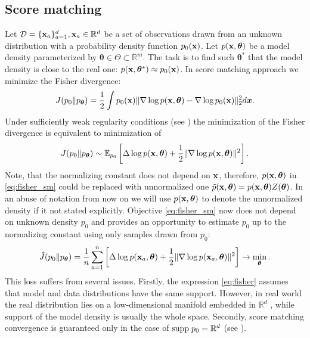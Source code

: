 \subsection{Score matching}
Let ${\cal D} = \{{\bf x}_a\}_{a = 1}^d, {\bf x}_a \in \mathbb{R}^d$ be a set of observations
drawn from an unknown distribution with a probability density function $p_0({\bf x})$.
Let $p({\bf x}, {\bm \theta})$ be a model density parameterized by
${\bm \theta} \in \Theta \subset \mathbb{R}^m$.
The task is to find such ${\bm \theta}^*$ that the model density is close to the real one:
$p({\bf x}, {\bm \theta}^*) \approx p_0({\bf x})$.
In score matching approach we minimize the Fisher divergence:
\begin{equation}
    J(p_0 \| p_{\bm{\theta}}) = \frac12 \int p_0({\bf x})\|\nabla \log p({\bf x}, {\bm \theta}) - \nabla \log p_0({\bf x})\|_2^2 d\bm{x}.
    \label{eq:fisher}
\end{equation}
Under sufficiently weak regularity conditions (see \cite{Hyvarinen2005})
the minimization of the Fisher divergence is equivalent to minimization of
\begin{equation}
    J(p_0 \| p_{\bm{\theta}}) \sim \mathbb{E}_{p_0}\left[\Delta \log p({\bf x}, {\bm \theta}) + \frac{1}{2}\|\nabla \log p({\bf x}, {\bm \theta})\|^2\right]
    \label{eq:fisher_sm}.
\end{equation}
Note, that the normalizing constant does not depend on ${\bf x}$,
therefore, $p({\bf x}, {\bm \theta})$ in \eqref{eq:fisher_sm}
could be replaced with unnormalized one
$\Tilde{p}({\bf x}, {\bm \theta}) = p({\bf x}, {\bm \theta}) Z({\bm \theta})$.
In an abuse of notation from now on we will use
$p({\bf x}, {\bm \theta})$ to denote the unnormalized density if it not stated explicitly.
Objective \eqref{eq:fisher_sm} now does not depend on unknown density $p_0$ and provides an
opportunity to estimate $p_0$ up to the normalizing constant using only samples drawn from $p_0$:
\begin{equation}
    \hat{J}(p_0 \| p_{\bm{\theta}}) = \frac{1}{n}\sum_{a = 1}^n\left[\Delta \log p({\bf x}_a, {\bm \theta}) + \frac{1}{2}\|\nabla \log p({\bf x}_a, {\bm \theta})\|^2\right] \to \min_{{\bm \theta}}.
    \label{eq:fisher_sm_sample}
\end{equation}
This loss suffers from several issues.
Firstly, the expression \eqref{eq:fisher} assumes that model and data distributions
have the same support.
However, in real world the real distribution lies on a low-dimensional manifold embedded
in $\mathbb{R}^d$ \cite{song2019generative},
while support of the model density is usually the whole space.
Secondly, score matching convergence is guaranteed only in the case of
${\rm supp\;} p_0 = \mathbb{R}^d$ (see \cite{Hyvarinen2005}).

